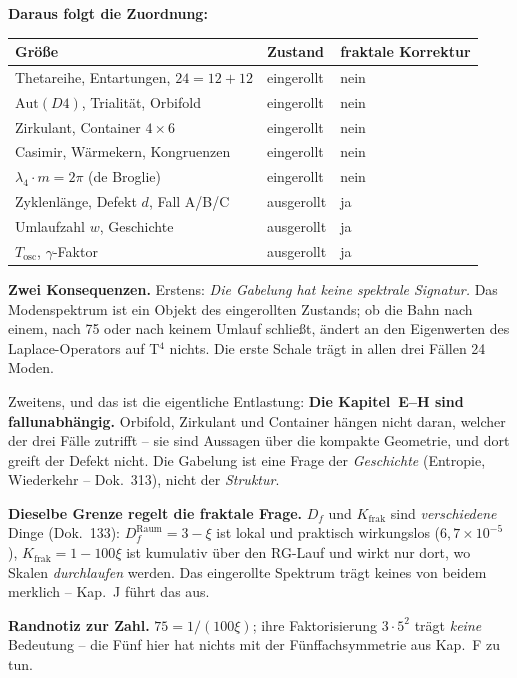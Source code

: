 \documentclass[11pt]{report}
\begin{document}
\textbf{Daraus folgt die Zuordnung:}

\begin{center}
\begin{tabular}{lll}
\toprule
Größe & Zustand & fraktale Korrektur \\
\midrule
Thetareihe, Entartungen, $24 = 12+12$ & eingerollt & nein \\
$\text{Aut}(D4)$, Trialität, Orbifold & eingerollt & nein \\
Zirkulant, Container $4\times6$ & eingerollt & nein \\
Casimir, Wärmekern, Kongruenzen & eingerollt & nein \\
$\lambda_4\cdot m = 2\pi$ (de Broglie) & eingerollt & nein \\
\midrule
Zyklenlänge, Defekt $d$, Fall A/B/C & ausgerollt & ja \\
Umlaufzahl $w$, Geschichte & ausgerollt & ja \\
$T_\text{osc}$, $\gamma$-Faktor & ausgerollt & ja \\
\bottomrule
\end{tabular}
\end{center}

\textbf{Zwei Konsequenzen.} Erstens: \emph{Die Gabelung hat keine
spektrale Signatur.} Das Modenspektrum ist ein Objekt des
eingerollten Zustands; ob die Bahn nach einem, nach 75 oder nach
keinem Umlauf schließt, ändert an den Eigenwerten des
Laplace-Operators auf T$^4$ nichts. Die erste Schale trägt in
allen drei Fällen 24 Moden.

Zweitens, und das ist die eigentliche Entlastung: \textbf{Die
Kapitel~E--H sind fallunabhängig.} Orbifold, Zirkulant und
Container hängen nicht daran, welcher der drei Fälle zutrifft --
sie sind Aussagen über die kompakte Geometrie, und dort greift
der Defekt nicht. Die Gabelung ist eine Frage der
\emph{Geschichte} (Entropie, Wiederkehr -- Dok.~313), nicht der
\emph{Struktur}.

\textbf{Dieselbe Grenze regelt die fraktale Frage.} $D_f$ und
$K_\text{frak}$ sind \emph{verschiedene} Dinge (Dok.~133):
$D_f^\text{Raum} = 3-\xi$ ist lokal und praktisch wirkungslos
($6{,}7\times10^{-5}$), $K_\text{frak} = 1-100\xi$ ist kumulativ
über den RG-Lauf und wirkt nur dort, wo Skalen \emph{durchlaufen}
werden. Das eingerollte Spektrum trägt keines von beidem merklich
-- Kap.~J führt das aus.

\textbf{Randnotiz zur Zahl.} $75 = 1/(100\xi)$; ihre
Faktorisierung $3\cdot5^2$ trägt \emph{keine} Bedeutung -- die
Fünf hier hat nichts mit der Fünffachsymmetrie aus Kap.~F zu tun.
\end{document}
